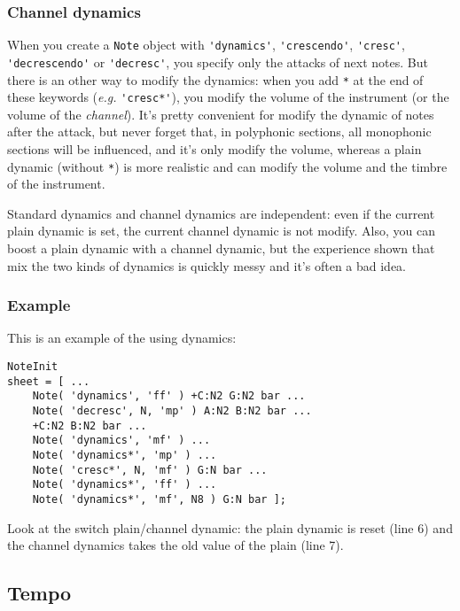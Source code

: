 \documentclass{article}
\newcommand\sfz{s$\!f\!$z\xspace}
\begin{document}
\subsubsection{Channel dynamics}
\label{sec:ChannelDynamics}

When you create a \lstinline!Note! object with \lstinline!'dynamics'!, \lstinline!'crescendo'!, \lstinline!'cresc'!, \lstinline!'decrescendo'! or \lstinline!'decresc'!, you specify only the attacks of next notes. But there is an other way to modify the dynamics: when you add \lstinline!*! at the end of these keywords (\emph{e.g.} \lstinline!'cresc*'!), you modify the volume of the instrument (or the volume of the \emph{channel}). It's pretty convenient for modify the dynamic of notes after the attack, but never forget that, in polyphonic sections, all monophonic sections will be influenced, and it's only modify the volume, whereas a plain dynamic (without \lstinline!*!) is more realistic and can modify the volume and the timbre of the instrument.

Standard dynamics and channel dynamics are independent: even if the current plain dynamic is set, the current channel dynamic is not modify. Also, you can boost a plain dynamic with a channel dynamic, but the experience shown that mix the two kinds of dynamics is quickly messy and it's often a bad idea.

\subsubsection{Example}

This is an example of the using dynamics: \\

\begin{lstlisting}
NoteInit
sheet = [ ...
	Note( 'dynamics', 'ff' ) +C:N2 G:N2 bar ...
	Note( 'decresc', N, 'mp' ) A:N2 B:N2 bar ...
	+C:N2 B:N2 bar ...
	Note( 'dynamics', 'mf' ) ...
	Note( 'dynamics*', 'mp' ) ...
	Note( 'cresc*', N, 'mf' ) G:N bar ...
	Note( 'dynamics*', 'ff' ) ...
	Note( 'dynamics*', 'mf', N8 ) G:N bar ];
\end{lstlisting}

Look at the switch plain/channel dynamic: the plain dynamic is reset (line 6) and the channel dynamics takes the old value of the plain (line 7).

\subsection{Tempo}
\label{sec:Tempo}
\end{document}
